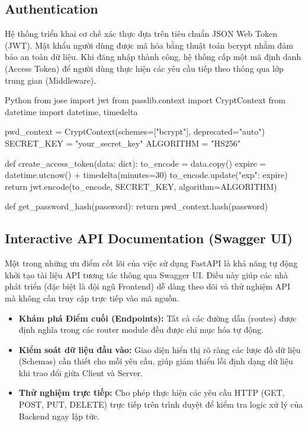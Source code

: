 \subsection{Authentication}

Hệ thống triển khai cơ chế xác thực dựa trên tiêu chuẩn JSON Web Token (JWT). Mật khẩu người dùng được mã hóa bằng thuật toán bcrypt nhằm đảm bảo an toàn dữ liệu. Khi đăng nhập thành công, hệ thống cấp một mã định danh (Access Token) để người dùng thực hiện các yêu cầu tiếp theo thông qua lớp trung gian (Middleware).

\begin{mycode}{Python}
from jose import jwt
from passlib.context import CryptContext
from datetime import datetime, timedelta

pwd_context = CryptContext(schemes=["bcrypt"], deprecated="auto")
SECRET_KEY = "your_secret_key"
ALGORITHM = "HS256"

def create_access_token(data: dict):
    to_encode = data.copy()
    expire = datetime.utcnow() + timedelta(minutes=30)
    to_encode.update({"exp": expire})
    return jwt.encode(to_encode, SECRET_KEY, algorithm=ALGORITHM)

def get_password_hash(password):
    return pwd_context.hash(password)
\end{mycode}

\subsection{Interactive API Documentation (Swagger UI)}

Một trong những ưu điểm cốt lõi của việc sử dụng FastAPI là khả năng tự động khởi tạo tài liệu API tương tác thông qua Swagger UI. Điều này giúp các nhà phát triển (đặc biệt là đội ngũ Frontend) dễ dàng theo dõi và thử nghiệm API mà không cần truy cập trực tiếp vào mã nguồn.

\begin{itemize}[leftmargin=*]
\item \textbf{Khám phá Điểm cuối (Endpoints):} Tất cả các đường dẫn (routes) được định nghĩa trong các router module đều được chỉ mục hóa tự động.
\item \textbf{Kiểm soát dữ liệu đầu vào:} Giao diện hiển thị rõ ràng các lược đồ dữ liệu (Schemas) cần thiết cho mỗi yêu cầu, giúp giảm thiểu lỗi định dạng dữ liệu khi trao đổi giữa Client và Server.
\item \textbf{Thử nghiệm trực tiếp:} Cho phép thực hiện các yêu cầu HTTP (GET, POST, PUT, DELETE) trực tiếp trên trình duyệt để kiểm tra logic xử lý của Backend ngay lập tức.
\end{itemize}

